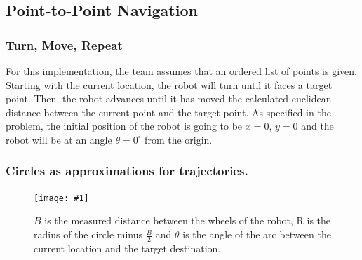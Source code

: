 \documentclass[11pt,conference,onecolumn]{article} %
\newcommand{\myfigure}[4]{
  \begin{figure}[h!]
      \centering
      \texttt{[image: \#1]}
      \caption{#2}
\label{#4}
    \end{figure}
}
\begin{document}
\subsection*{Point-to-Point Navigation}

\subsubsection*{Turn, Move, Repeat}
For this implementation, the team assumes that an ordered list of points is given. Starting with the current location, the robot will turn until it faces a target point. Then, the robot advances until it has moved the calculated euclidean distance between the current point and the target point. As specified in the problem, the initial position of the robot is going to be $x=0$, $y=0$ and the robot will be at an angle $\theta=0^{\circ}$ from the origin.


\subsubsection*{Circles as approximations for trajectories.}
\myfigure{images/robotCircle.png}{$B$ is the measured distance between the wheels 
of the robot, R is the radius of the circle minus $\frac{B}{2}$ and $\theta$ is the angle of the arc between the current location and the target destination.}{0.5}{fig:robotCircle}
\end{document}
